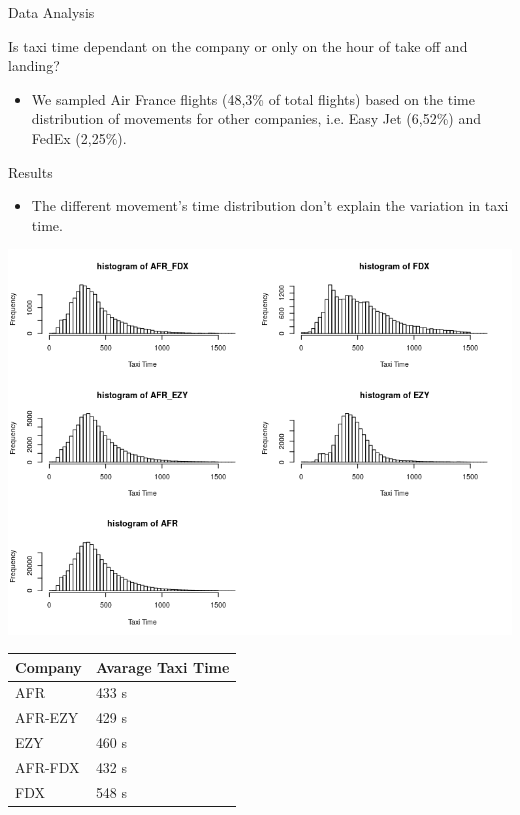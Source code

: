 \documentclass{beamer}
\begin{document}
\begin{frame}{Data Analysis}

	 Is taxi time dependant on the company or only on the hour of take off and landing?




\begin{itemize}
	\item We sampled Air France flights (48,3\% of total flights) based on the time distribution of movements for other companies, i.e. Easy Jet (6,52\%) and FedEx (2,25\%).
\end{itemize}


\end{frame}


\begin{frame}{Results}
\begin{itemize}
	\item The different movement's time distribution don't explain the variation in taxi time.
\end{itemize}
\begin{minipage}{\textwidth}
	\begin{minipage}[b]{0.49\textwidth}
		\centering
		\includegraphics[scale=0.35]{taxi_time_sample_AFR.png}
	\end{minipage}
	\hfill
	\begin{minipage}[b]{0.3\linewidth}
		\centering
		\tiny
		\begin{tabular}{p{1.1cm}p{2cm}}\hline
			Company & Avarage Taxi Time \\ \hline
			AFR & 433 s \\
			AFR-EZY & 429 s\\
			EZY & 460 s \\
			AFR-FDX & 432 s\\
			FDX & 548 s \\ \hline
		\end{tabular}

		\bigskip
		\bigskip
		\bigskip
		\bigskip
		\bigskip
		\bigskip
		
	\end{minipage}
\end{minipage}
\end{frame}
\end{document}
